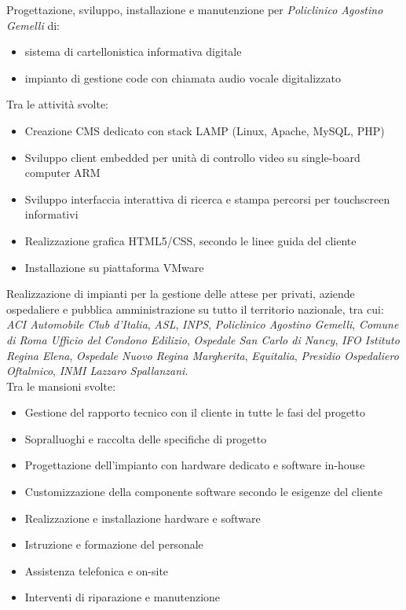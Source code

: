 \documentclass[a4paper, 11pt]{moderncv}
\begin{document}
        {Progettazione, sviluppo, installazione e manutenzione per \emph{Policlinico Agostino Gemelli} di:
          \begin{itemize}
          \item  sistema di cartellonistica informativa digitale
          \item  impianto di gestione code con chiamata audio vocale digitalizzato
          \end{itemize}
          Tra le attività svolte:
          \begin{itemize}
          \item Creazione CMS dedicato con stack LAMP (Linux, Apache, MySQL, PHP)
          \item Sviluppo client embedded per unità di controllo video su single-board computer ARM
          \item Sviluppo interfaccia interattiva di ricerca e stampa percorsi per touchscreen informativi
          \item Realizzazione grafica HTML5/CSS, secondo le linee guida del cliente
          \item Installazione su piattaforma VMware
          \end{itemize}}
\vspace{3mm}
        {Realizzazione di impianti per la gestione delle attese per privati, aziende ospedaliere e pubblica 
          amministrazione su tutto il territorio nazionale, tra cui: \emph{ACI Automobile Club d'Italia}, \emph{ASL}, \emph{INPS}, \emph{Policlinico Agostino Gemelli}, \emph{Comune di Roma Ufficio del Condono Edilizio}, \emph{Ospedale San Carlo di Nancy}, \emph{IFO Istituto Regina Elena}, \emph{Ospedale Nuovo Regina Margherita}, \emph{Equitalia}, \emph{Presidio Ospedaliero Oftalmico}, \emph{INMI Lazzaro Spallanzani}.\\Tra le mansioni svolte:
          \begin{itemize}
          \item Gestione del rapporto tecnico con il cliente in tutte le fasi del progetto
          \item Sopralluoghi e raccolta delle specifiche di progetto
          \item Progettazione dell'impianto con hardware dedicato e software in-house
          \item Customizzazione della componente software secondo le esigenze del cliente
          \item Realizzazione e installazione hardware e software
          \item Istruzione e formazione del personale
          \item Assistenza telefonica e on-site
          \item Interventi di riparazione e manutenzione
          \end{itemize}}
\end{document}
